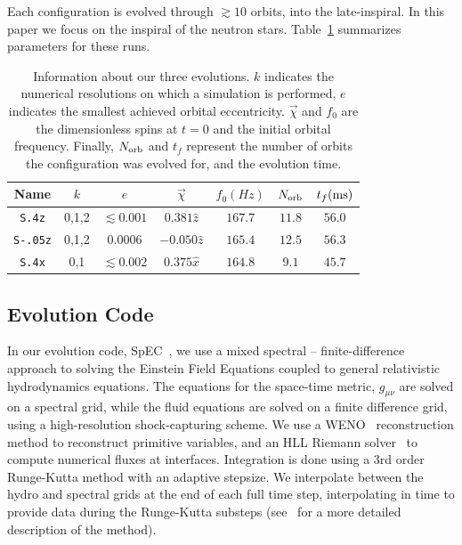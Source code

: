 {Each configuration is evolved through $\gtrsim 10$ orbits, into the
late-inspiral.  In this paper we focus on the inspiral of the neutron
stars.  Table~\ref{tab:RunInfo} summarizes parameters for these runs.
\begin{table}
\centering
\begin{tabular} {c | c | c | c | c | c | c}
Name & $k$ & $e$ & $\vec{\chi}$ & $f_{0}(Hz)$ & $N_{\rm orb}$ & $t_{f}({\rm ms})$ \\ \hline
{\tt S.4z} & 0,1,2 & $\lesssim 0.001$ & $0.381\hat{z}$ & $167.7$ & $11.8$ & $56.0$ \\ \hline
{\tt S-.05z} & 0,1,2 & $0.0006$ & $-0.050\hat{z}$ & $165.4$ & $12.5$ & $56.3$ \\ \hline
{\tt S.4x} & 0,1 & $\lesssim 0.002$ & $0.375\hat{x}$ & $164.8$ & $9.1$ & $45.7$ \\ \hline
\end{tabular}
\caption[Detailed information about our three evolutions.]{ {\label{tab:RunInfo}} Information about our three evolutions.  $k$ indicates the numerical resolutions on which a simulation is performed, $e$ indicates the smallest achieved orbital eccentricity.  $\vec\chi$ and $f_0$ are the dimensionless spins at $t=0$ and the initial orbital frequency.  Finally, $N_{\rm orb}$ and $t_f$ represent the number of orbits the configuration was evolved for, and the evolution time.}
\end{table}



\subsection{Evolution Code}
\label{sec:EvolutionCode}

In our evolution code, SpEC~\cite{Buchman:2012dw,Lovelace:2011nu,
  Scheel2009,Kidder2000a,Lindblom2006,Scheel2006,Szilagyi:2009qz,Lovelace:2010ne,
  Hemberger:2012jz,Ossokine:2013zga}, we use a mixed spectral --
finite-difference approach to solving the Einstein Field Equations
coupled to general relativistic hydrodynamics equations.  The
equations for the space-time metric, $g_{\mu\nu}$ are solved on a
spectral grid, while the fluid equations are solved on a finite
difference grid, using a high-resolution shock-capturing scheme. We
use a WENO~\cite{Jiang1996202,Liu1994200} reconstruction method to
reconstruct primitive variables, and an HLL Riemann solver~\cite{HLL}
to compute numerical fluxes at interfaces. Integration is done using a
3rd order Runge-Kutta method with an adaptive stepsize. We interpolate
between the hydro and spectral grids at the end of each full time
step, interpolating in time to provide data during the Runge-Kutta
substeps
(see~\cite{Duez:2008rb,FoucartEtAl:2011,Foucart:2013a,Muhlberger2014}
for a more detailed description of the method).  

}
